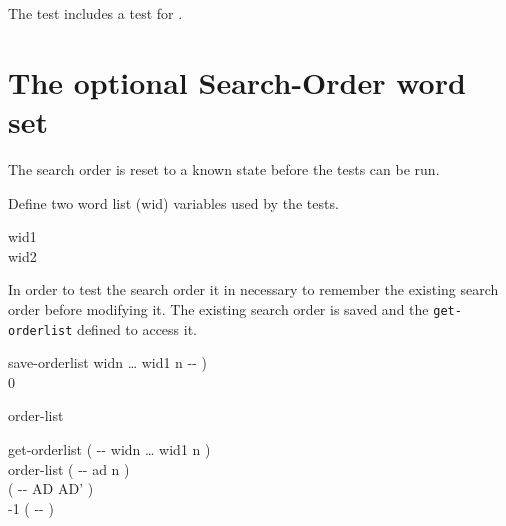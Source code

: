The test  includes a test for .

\cbend
{}




\section{The optional Search-Order word set} %

\cbstart{}
The search order is reset to a known state before the tests can be
run.

\begin{tt}
  
\end{tt}

Define two word list (wid) variables used by the tests.

\begin{tt}
 wid1 \\
 wid2
\end{tt}

In order to test the search order it in necessary to remember the
existing search order before modifying it.  The existing search order
is saved and the \texttt{get-orderlist} defined to access it.

\begin{tt}
\word{:} save-orderlist  widn {\ldots} wid1 n -{}- ) \\
\tab {} \word{,} 0  \word{,}  \\
\word{;}

 order-list \\

\word{:} get-orderlist  ( -{}- widn {\ldots} wid1 n ) \\
\tab order-list   	\tab[1] ( -{}- ad n ) \\
\tab {} \word{+}							\tab[10.5] ( -{}- AD AD' ) \\
\tab {}   -1   \tab[1]  ( -{}- ) \\
\word{;}
\end{tt}

